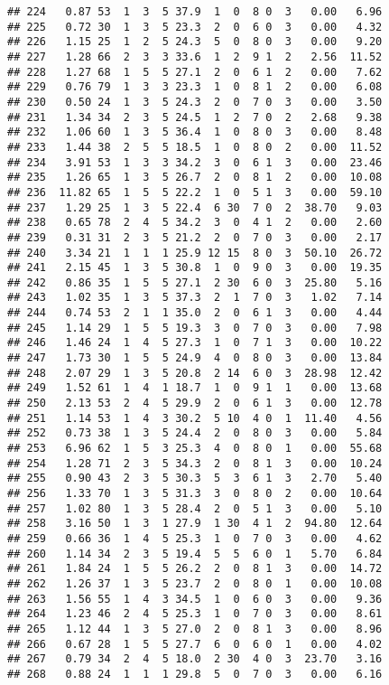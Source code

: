 \documentclass[
]{article}
\begin{document}
\begin{verbatim}
## 224   0.87 53  1  3  5 37.9  1  0  8 0  3   0.00   6.96
## 225   0.72 30  1  3  5 23.3  2  0  6 0  3   0.00   4.32
## 226   1.15 25  1  2  5 24.3  5  0  8 0  3   0.00   9.20
## 227   1.28 66  2  3  3 33.6  1  2  9 1  2   2.56  11.52
## 228   1.27 68  1  5  5 27.1  2  0  6 1  2   0.00   7.62
## 229   0.76 79  1  3  3 23.3  1  0  8 1  2   0.00   6.08
## 230   0.50 24  1  3  5 24.3  2  0  7 0  3   0.00   3.50
## 231   1.34 34  2  3  5 24.5  1  2  7 0  2   2.68   9.38
## 232   1.06 60  1  3  5 36.4  1  0  8 0  3   0.00   8.48
## 233   1.44 38  2  5  5 18.5  1  0  8 0  2   0.00  11.52
## 234   3.91 53  1  3  3 34.2  3  0  6 1  3   0.00  23.46
## 235   1.26 65  1  3  5 26.7  2  0  8 1  2   0.00  10.08
## 236  11.82 65  1  5  5 22.2  1  0  5 1  3   0.00  59.10
## 237   1.29 25  1  3  5 22.4  6 30  7 0  2  38.70   9.03
## 238   0.65 78  2  4  5 34.2  3  0  4 1  2   0.00   2.60
## 239   0.31 31  2  3  5 21.2  2  0  7 0  3   0.00   2.17
## 240   3.34 21  1  1  1 25.9 12 15  8 0  3  50.10  26.72
## 241   2.15 45  1  3  5 30.8  1  0  9 0  3   0.00  19.35
## 242   0.86 35  1  5  5 27.1  2 30  6 0  3  25.80   5.16
## 243   1.02 35  1  3  5 37.3  2  1  7 0  3   1.02   7.14
## 244   0.74 53  2  1  1 35.0  2  0  6 1  3   0.00   4.44
## 245   1.14 29  1  5  5 19.3  3  0  7 0  3   0.00   7.98
## 246   1.46 24  1  4  5 27.3  1  0  7 1  3   0.00  10.22
## 247   1.73 30  1  5  5 24.9  4  0  8 0  3   0.00  13.84
## 248   2.07 29  1  3  5 20.8  2 14  6 0  3  28.98  12.42
## 249   1.52 61  1  4  1 18.7  1  0  9 1  1   0.00  13.68
## 250   2.13 53  2  4  5 29.9  2  0  6 1  3   0.00  12.78
## 251   1.14 53  1  4  3 30.2  5 10  4 0  1  11.40   4.56
## 252   0.73 38  1  3  5 24.4  2  0  8 0  3   0.00   5.84
## 253   6.96 62  1  5  3 25.3  4  0  8 0  1   0.00  55.68
## 254   1.28 71  2  3  5 34.3  2  0  8 1  3   0.00  10.24
## 255   0.90 43  2  3  5 30.3  5  3  6 1  3   2.70   5.40
## 256   1.33 70  1  3  5 31.3  3  0  8 0  2   0.00  10.64
## 257   1.02 80  1  3  5 28.4  2  0  5 1  3   0.00   5.10
## 258   3.16 50  1  3  1 27.9  1 30  4 1  2  94.80  12.64
## 259   0.66 36  1  4  5 25.3  1  0  7 0  3   0.00   4.62
## 260   1.14 34  2  3  5 19.4  5  5  6 0  1   5.70   6.84
## 261   1.84 24  1  5  5 26.2  2  0  8 1  3   0.00  14.72
## 262   1.26 37  1  3  5 23.7  2  0  8 0  1   0.00  10.08
## 263   1.56 55  1  4  3 34.5  1  0  6 0  3   0.00   9.36
## 264   1.23 46  2  4  5 25.3  1  0  7 0  3   0.00   8.61
## 265   1.12 44  1  3  5 27.0  2  0  8 1  3   0.00   8.96
## 266   0.67 28  1  5  5 27.7  6  0  6 0  1   0.00   4.02
## 267   0.79 34  2  4  5 18.0  2 30  4 0  3  23.70   3.16
## 268   0.88 24  1  1  1 29.8  5  0  7 0  3   0.00   6.16

\end{verbatim}
\end{document}
